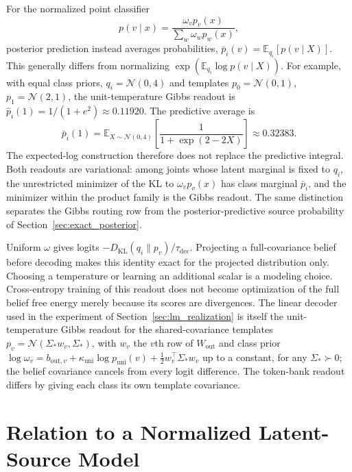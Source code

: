 \documentclass[twoside,11pt]{article}
\begin{document}
For the normalized point classifier
\begin{equation}
p(v\mid x)=\frac{\omega_vp_v(x)}
{\sum_w\omega_wp_w(x)},
\label{eq:readout_point_classifier}
\end{equation}
posterior prediction instead averages probabilities,
$\bar p_i(v)=\mathbb E_{q_i}[p(v\mid X)]$. This generally differs from normalizing $\exp(\mathbb E_{q_i}\log p(v\mid X))$. For example, with equal class priors, $q_i=\mathcal N(0,4)$ and templates $p_0=\mathcal N(0,1)$, $p_1=\mathcal N(2,1)$, the unit-temperature Gibbs readout is $\hat p_i(1)=1/(1+e^2)\approx0.11920$. The predictive average is
\begin{equation}
\bar p_i(1)=\mathbb E_{X\sim\mathcal N(0,4)}
\left[\frac{1}{1+\exp(2-2X)}\right]\approx0.32383.
\end{equation}
The expected-log construction therefore does not replace the predictive integral. Both readouts are variational: among joints whose latent marginal is fixed to $q_i$, the unrestricted minimizer of the KL to $\omega_vp_v(x)$ has class marginal $\bar p_i$, and the minimizer within the product family is the Gibbs readout. The same distinction separates the Gibbs routing row from the posterior-predictive source probability of Section~\ref{sec:exact_posterior}.

Uniform $\omega$ gives logits $-D_{\mathrm{KL}}(q_i\|p_v)/\tau_{\mathrm{dec}}$. Projecting a full-covariance belief before decoding makes this identity exact for the projected distribution only. Choosing a temperature or learning an additional scalar is a modeling choice. Cross-entropy training of this readout does not become optimization of the full belief free energy merely because its scores are divergences. The linear decoder used in the experiment of Section~\ref{sec:lm_realization} is itself the unit-temperature Gibbs readout for the shared-covariance templates $p_v=\mathcal N(\Sigma_*w_v,\Sigma_*)$, with $w_v$ the $v$th row of $W_{\mathrm{out}}$ and class prior $\log\omega_v=b_{\mathrm{out},v}+\kappa_{\mathrm{uni}}\log p_{\mathrm{uni}}(v)+\tfrac12w_v^\top\Sigma_*w_v$ up to a constant, for any $\Sigma_*\succ0$; the belief covariance cancels from every logit difference. The token-bank readout differs by giving each class its own template covariance.

\section{Relation to a Normalized Latent-Source Model}
\label{app:fixed_joint_bridge}
\end{document}
